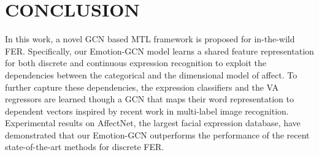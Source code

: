 \documentclass[a4paper, 10pt, conference]{ieeeconf}      \usepackage{FG2021}
\begin{document}
\section{CONCLUSION}
\label{sec:conclusion}

In this work, a novel GCN based MTL framework is proposed for in-the-wild FER. Specifically, our Emotion-GCN model learns a shared feature representation for both discrete and continuous expression recognition to exploit the dependencies between the categorical and the dimensional model of affect. To further capture these dependencies, the expression classifiers and the VA regressors are learned though a GCN that maps their word representation to dependent vectors inspired by recent work in multi-label image recognition. Experimental results on AffectNet, the largest facial expression database, have demonstrated that our Emotion-GCN outperforms the performance of the recent state-of-the-art methods for discrete FER.

\addtolength{\textheight}{0cm}   

{\small


}
\end{document}
